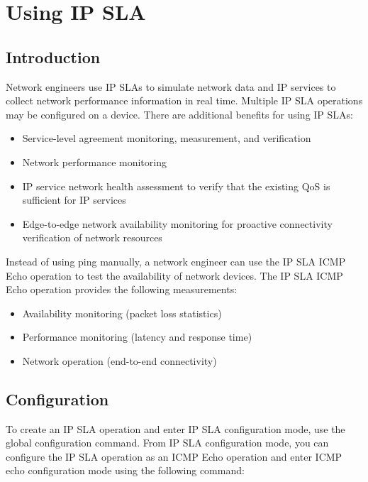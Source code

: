 \section{Using IP SLA}

\subsection{Introduction}

Network engineers use IP SLAs to simulate network data and IP services to collect network performance information in real time. Multiple IP SLA operations may be configured on a device. There are additional benefits for using IP SLAs: 

\begin{itemize}
\item Service-level agreement monitoring, measurement, and verification
\item Network performance monitoring
\item IP service network health assessment to verify that the existing QoS is sufficient for IP services
\item Edge-to-edge network availability monitoring for proactive connectivity verification of network resources
\end{itemize}

Instead of using ping manually, a network engineer can use the IP SLA ICMP Echo operation to test the availability of network devices. The IP SLA ICMP Echo operation provides the following measurements:

\begin{itemize}
\item Availability monitoring (packet loss statistics)
\item Performance monitoring (latency and response time)
\item Network operation (end-to-end connectivity)
\end{itemize}

\subsection{Configuration}

To create an IP SLA operation and enter IP SLA configuration mode, use the  global configuration command. From IP SLA configuration mode, you can configure the IP SLA operation as an ICMP Echo operation and enter ICMP echo configuration mode using the following command:

